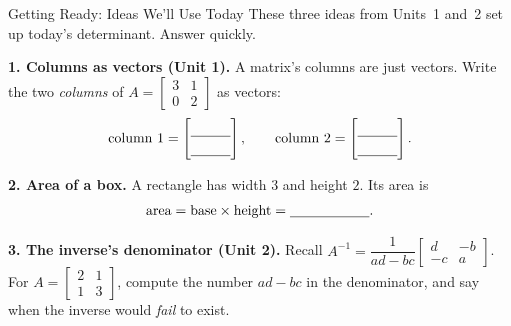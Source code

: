 \documentclass[10pt]{article}
\begin{document}
\namedateperiod

\vspace{0.12in}

\begin{notesbox}{Getting Ready: Ideas We'll Use Today}
\small These three ideas from Units~1 and~2 set up today's determinant. Answer quickly.

\vspace{4pt}
\textbf{1. Columns as vectors (Unit 1).} A matrix's columns are just vectors. Write the two
\emph{columns} of $A=\begin{bmatrix} 3 & 1 \\ 0 & 2 \end{bmatrix}$ as vectors:
\[
  \text{column 1} = \begin{bmatrix}\rule{0pt}{1.1em}\blank{1.0cm}\\[2pt]\blank{1.0cm}\end{bmatrix},
  \qquad
  \text{column 2} = \begin{bmatrix}\rule{0pt}{1.1em}\blank{1.0cm}\\[2pt]\blank{1.0cm}\end{bmatrix}.
\]

\vspace{4pt}
\textbf{2. Area of a box.} A rectangle has width $3$ and height $2$. Its area is
\[
  \text{area} = \text{base}\times\text{height} = \blank{2.0cm}.
\]

\vspace{4pt}
\textbf{3. The inverse's denominator (Unit 2).} Recall
$A^{-1}=\dfrac{1}{ad-bc}\begin{bmatrix} d & -b \\ -c & a \end{bmatrix}$. For
$A=\begin{bmatrix} 2 & 1 \\ 1 & 3 \end{bmatrix}$, compute the number $ad-bc$ in the denominator, and
say when the inverse would \emph{fail} to exist.
\writeline
\end{notesbox}
\end{document}
